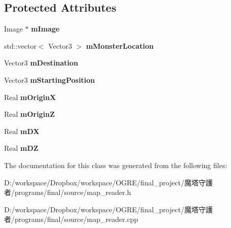 \subsection*{Protected Attributes}
\begin{DoxyCompactItemize}
\item 
\hypertarget{class_m_a_p___r_e_a_d_e_r_ae4aec1db4ccdd1edf681b6e6cf52ea88}{
Image $\ast$ {\bfseries mImage}}
\label{class_m_a_p___r_e_a_d_e_r_ae4aec1db4ccdd1edf681b6e6cf52ea88}

\item 
\hypertarget{class_m_a_p___r_e_a_d_e_r_a560479449f04340363699f50c0427f83}{
std::vector$<$ Vector3 $>$ {\bfseries mMonsterLocation}}
\label{class_m_a_p___r_e_a_d_e_r_a560479449f04340363699f50c0427f83}

\item 
\hypertarget{class_m_a_p___r_e_a_d_e_r_a20ee916780912a6ba6f43d64cc345515}{
Vector3 {\bfseries mDestination}}
\label{class_m_a_p___r_e_a_d_e_r_a20ee916780912a6ba6f43d64cc345515}

\item 
\hypertarget{class_m_a_p___r_e_a_d_e_r_ac5511f0526eefe6ead20d720c5f12a19}{
Vector3 {\bfseries mStartingPosition}}
\label{class_m_a_p___r_e_a_d_e_r_ac5511f0526eefe6ead20d720c5f12a19}

\item 
\hypertarget{class_m_a_p___r_e_a_d_e_r_a486374d93548e3ec2fe6cc6ed5b73772}{
Real {\bfseries mOriginX}}
\label{class_m_a_p___r_e_a_d_e_r_a486374d93548e3ec2fe6cc6ed5b73772}

\item 
\hypertarget{class_m_a_p___r_e_a_d_e_r_a7f5a38d690dbe1f0230c7575b9868dc5}{
Real {\bfseries mOriginZ}}
\label{class_m_a_p___r_e_a_d_e_r_a7f5a38d690dbe1f0230c7575b9868dc5}

\item 
\hypertarget{class_m_a_p___r_e_a_d_e_r_a202098ca45af2d36e2cdb5a06390ea47}{
Real {\bfseries mDX}}
\label{class_m_a_p___r_e_a_d_e_r_a202098ca45af2d36e2cdb5a06390ea47}

\item 
\hypertarget{class_m_a_p___r_e_a_d_e_r_a7b155aac9d8a950387cc95dba507a3f6}{
Real {\bfseries mDZ}}
\label{class_m_a_p___r_e_a_d_e_r_a7b155aac9d8a950387cc95dba507a3f6}

\end{DoxyCompactItemize}


The documentation for this class was generated from the following files:\begin{DoxyCompactItemize}
\item 
D:/workspace/Dropbox/workspace/OGRE/final\_\-project/魔塔守護者/programs/final/source/map\_\-reader.h\item 
D:/workspace/Dropbox/workspace/OGRE/final\_\-project/魔塔守護者/programs/final/source/map\_\-reader.cpp\end{DoxyCompactItemize}
